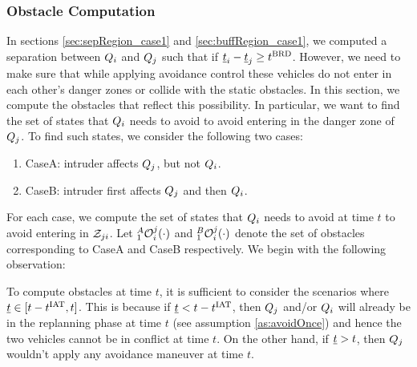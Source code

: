 \subsubsection{Obstacle Computation} \label{sec:intruderObs_case1}
In sections \ref{sec:sepRegion_case1} and \ref{sec:buffRegion_case1}, we computed a separation between $Q_i$ and $Q_j$ such that if $\underline{t}_i - \underline{t}_j \geq t^\text{BRD}$. However, we need to make sure that while applying avoidance control these vehicles do not enter in each other's danger zones or collide with the static obstacles. In this section, we compute the obstacles that reflect this possibility. In particular, we want to find the set of states that $Q_i$ needs to avoid to avoid entering in the danger zone of $Q_j$. To find such states, we consider the following two cases:
\begin{enumerate}
\item CaseA: intruder affects $Q_j$, but not $Q_i$.
\item CaseB: intruder first affects $Q_j$ and then $Q_i$.
\end{enumerate}
For each case, we compute the set of states that $Q_i$ needs to avoid at time $t$ to avoid entering in $\mathcal{Z}_{ji}$. Let $_1^A\mathcal{O}_i^j(\cdot)$ and $_1^B\mathcal{O}_i^j(\cdot)$ denote the set of obstacles corresponding to CaseA and CaseB respectively. We begin with the following observation: 
\begin{observation} \label{obs1_case1Obs}
To compute obstacles at time $t$, it is sufficient to consider the scenarios where $\underline{t} \in [t-t^\text{IAT}, t]$. This is because if $\underline{t} < t - t^\text{IAT}$, then $Q_j$ and/or $Q_i$ will already be in the replanning phase at time $t$ (see assumption \ref{as:avoidOnce}) and hence the two vehicles cannot be in conflict at time $t$. On the other hand, if $\underline{t} > t$, then $Q_j$ wouldn't apply any avoidance maneuver at time $t$. 
\end{observation}


